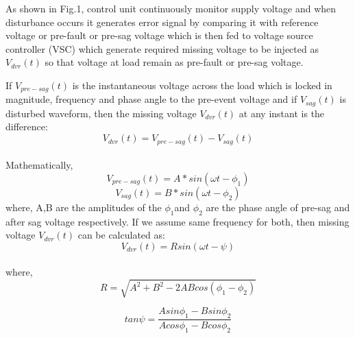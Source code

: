 \documentclass[journal,twoside]{IEEEtran}
\begin{document}
\bigskip
As shown in Fig.1, control unit continuously monitor supply voltage and when disturbance occurs it generates error signal by comparing it with reference voltage or pre-fault or pre-sag voltage which is then fed to voltage source controller (VSC) which generate required missing voltage to be injected as $V_{dvr}(t)$ so that voltage at load remain as pre-fault or pre-sag voltage.

\bigskip
If $V_{pre-sag}(t)$ is the instantaneous voltage across the load which is locked in magnitude, frequency and phase angle to the pre-event voltage and if $V_{sag}(t)$ is disturbed waveform, then the missing voltage $V_{dvr} (t)$ at any instant is the difference:\\
\begin{equation}
V_{dvr}(t) =V_{pre-sag}(t)-V_{sag}(t)
\end{equation}
\\Mathematically,\\
\begin{equation}
V_{pre-sag}(t)=A*sin(\omega t-\phi _{1})
\end{equation}
\begin{equation}
V_{sag}(t)=B*sin(\omega t-\phi _{2})
\end{equation}
where, A,B are the amplitudes of the $\phi _1$and $\phi _2$  are the phase angle of pre-sag and after sag voltage respectively. If we assume same frequency for both, then missing voltage $V_{dvr}(t)$ can be calculated as:\\
\begin{equation}
V_{dvr}(t)=Rsin(\omega t - \psi)
\end{equation}
\\where,\\
\begin{equation}
R=\sqrt{A^2+B^2-2ABcos(\phi _1-\phi _2)}
\end{equation}


\bigskip
\begin{equation}
tan{ \psi }=\frac{Asin{\phi _1}-Bsin{\phi _2}}{Acos{\phi _1}-Bcos{\phi _2}}
\end{equation}

\bigskip
\end{document}
